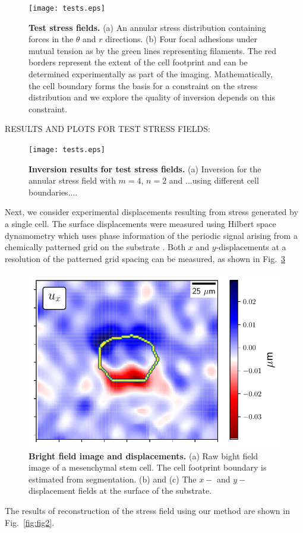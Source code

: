 \documentclass[aps,prl,reprint,twocolumn,groupedaddress,showpacs]{revtex4-1}
\begin{document}
\begin{figure}[t]
\begin{center}
%
\texttt{[image: tests.eps]}
\caption{\textbf{Test stress fields.} (a) An annular stress distribution containing forces in the
  $\theta$ and $r$ directions. (b) Four focal adhesions under mutual
  tension as by the green lines representing filaments. The red
  borders represent the extent of the cell footprint and can be
  determined experimentally as part of the imaging.  Mathematically,
  the cell boundary forms the basis for a constraint on the stress
  distribution and we explore the quality of inversion depends on this
  constraint.}
\label{TEST}
\end{center}
\end{figure}


RESULTS AND PLOTS FOR TEST STRESS FIELDS:

\begin{figure}[t]
\begin{center}
%
\texttt{[image: tests.eps]}
\caption{\textbf{Inversion results for test stress fields.} (a) Inversion for 
the annular stress field with $m=4$, $n=2$ and ...using different cell boundaries.... }
\label{RESULTS_TEST}
\end{center}
\end{figure}


Next, we consider experimental displacements resulting from stress
generated by a single cell. The surface displacements were measured
using Hilbert space dynamometry which uses phase information of the
periodic signal arising from a chemically patterned grid on the
substrate \cite{POPESCU}.  Both $x$ and $y$-displacements at a resolution of the
patterned grid spacing can be measured, as shown in Fig.~\ref{DATA}

\begin{figure}
\includegraphics[width=\linewidth]{fig0a}
\caption{\textbf{Bright field image and displacements.} (a) Raw bight
  field image of a mesenchymal stem cell. The cell footprint boundary
  is estimated from segmentation. (b) and (c) The $x-$ and
  $y-$displacement fields at the surface of the substrate.}
\label{DATA}
\end{figure}
%
The results of reconstruction of the stress field using our method are
shown in Fig.~\ref{fig:fig2}.
\end{document}
